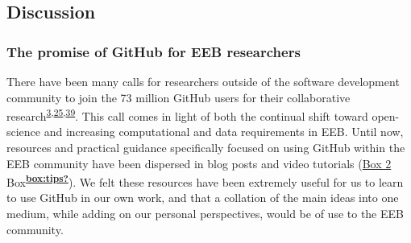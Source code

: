 \hypertarget{discussion}{%
\subsection{Discussion}\label{discussion}}

\hypertarget{the-promise-of-github-for-eeb-researchers}{%
\subsubsection{The promise of GitHub for EEB researchers}\label{the-promise-of-github-for-eeb-researchers}}

There have been many calls for researchers outside of the software development community to join the 73 million GitHub users for their collaborative research\textsuperscript{\protect\hyperlink{ref-10ghgV3S8}{3},\protect\hyperlink{ref-1Du6fzB8g}{25},\protect\hyperlink{ref-UsTxAq4f}{39}}.
This call comes in light of both the continual shift toward open-science and increasing computational and data requirements in EEB.
Until now, resources and practical guidance specifically focused on using GitHub within the EEB community have been dispersed in blog posts and video tutorials (\protect\hyperlink{tips}{Box 2} Box\textsuperscript{\protect\hyperlink{ref-box:tips}{\textbf{box:tips?}}}).
We felt these resources have been extremely useful for us to learn to use GitHub in our own work, and that a collation of the main ideas into one medium, while adding on our personal perspectives, would be of use to the EEB community.

